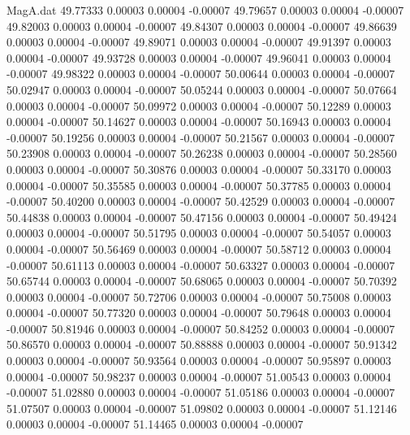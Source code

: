 \begin{filecontents}{MagA.dat}
  49.77333    0.00003    0.00004   -0.00007
  49.79657    0.00003    0.00004   -0.00007
  49.82003    0.00003    0.00004   -0.00007
  49.84307    0.00003    0.00004   -0.00007
  49.86639    0.00003    0.00004   -0.00007
  49.89071    0.00003    0.00004   -0.00007
  49.91397    0.00003    0.00004   -0.00007
  49.93728    0.00003    0.00004   -0.00007
  49.96041    0.00003    0.00004   -0.00007
  49.98322    0.00003    0.00004   -0.00007
  50.00644    0.00003    0.00004   -0.00007
  50.02947    0.00003    0.00004   -0.00007
  50.05244    0.00003    0.00004   -0.00007
  50.07664    0.00003    0.00004   -0.00007
  50.09972    0.00003    0.00004   -0.00007
  50.12289    0.00003    0.00004   -0.00007
  50.14627    0.00003    0.00004   -0.00007
  50.16943    0.00003    0.00004   -0.00007
  50.19256    0.00003    0.00004   -0.00007
  50.21567    0.00003    0.00004   -0.00007
  50.23908    0.00003    0.00004   -0.00007
  50.26238    0.00003    0.00004   -0.00007
  50.28560    0.00003    0.00004   -0.00007
  50.30876    0.00003    0.00004   -0.00007
  50.33170    0.00003    0.00004   -0.00007
  50.35585    0.00003    0.00004   -0.00007
  50.37785    0.00003    0.00004   -0.00007
  50.40200    0.00003    0.00004   -0.00007
  50.42529    0.00003    0.00004   -0.00007
  50.44838    0.00003    0.00004   -0.00007
  50.47156    0.00003    0.00004   -0.00007
  50.49424    0.00003    0.00004   -0.00007
  50.51795    0.00003    0.00004   -0.00007
  50.54057    0.00003    0.00004   -0.00007
  50.56469    0.00003    0.00004   -0.00007
  50.58712    0.00003    0.00004   -0.00007
  50.61113    0.00003    0.00004   -0.00007
  50.63327    0.00003    0.00004   -0.00007
  50.65744    0.00003    0.00004   -0.00007
  50.68065    0.00003    0.00004   -0.00007
  50.70392    0.00003    0.00004   -0.00007
  50.72706    0.00003    0.00004   -0.00007
  50.75008    0.00003    0.00004   -0.00007
  50.77320    0.00003    0.00004   -0.00007
  50.79648    0.00003    0.00004   -0.00007
  50.81946    0.00003    0.00004   -0.00007
  50.84252    0.00003    0.00004   -0.00007
  50.86570    0.00003    0.00004   -0.00007
  50.88888    0.00003    0.00004   -0.00007
  50.91342    0.00003    0.00004   -0.00007
  50.93564    0.00003    0.00004   -0.00007
  50.95897    0.00003    0.00004   -0.00007
  50.98237    0.00003    0.00004   -0.00007
  51.00543    0.00003    0.00004   -0.00007
  51.02880    0.00003    0.00004   -0.00007
  51.05186    0.00003    0.00004   -0.00007
  51.07507    0.00003    0.00004   -0.00007
  51.09802    0.00003    0.00004   -0.00007
  51.12146    0.00003    0.00004   -0.00007
  51.14465    0.00003    0.00004   -0.00007

\end{filecontents}
